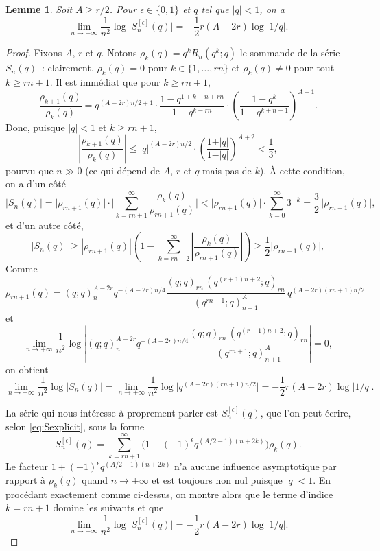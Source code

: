 \documentclass[12pt]{amsart}
\newcommand{\io}{\infty}
\newcommand{\ep}{\epsilon}
\newtheorem{lem}{Lemme}
\theoremstyle{remark}
\numberwithin{equation}{section}
\begin{document}
\begin{lem}\label{lem:asympserie}
Soit $A\ge r/2$.
Pour $\ep\in\{0,1\}$ et $q$ tel que $\vert q\vert<1$, on a
$$
\lim_{n\to +\io}\frac{1}{n^2}\log\vert S_{n}^{[\ep]}(q)\vert 
= -\frac 12 r(A-2r) \log\vert 1/q\vert .
$$
\end{lem}
\begin{proof} Fixons $A$, $r$ et $q$. 
Notons $\rho_{k}(q)=q^kR_n(q^k;q)$ le sommande de la s{\'e}rie
$S_n(q)$~: clairement, $\rho_k(q)=0$ pour 
$k\in\{1, \ldots, rn\}$ et $\rho_k(q)\ne 0$ pour 
tout $k\ge rn+1$. Il est imm{\'e}diat que pour $k\ge rn+1$, 
$$
\frac{\rho_{k+1}(q)}{\rho_{k}(q)}=
q^{(A-2r)n/2+1}\cdot 
\frac{1-q^{1+k+n+rn}}{1-q^{k-rn}}\cdot 
\left( \frac{1-q^k}{1-q^{k+n+1}}\right)^{A+1}.
$$
Donc, puisque $\vert q\vert <1$ et $k\ge rn+1$,  
$$
\left\vert\frac{\rho_{k+1}(q)}{\rho_{k}(q)}\right\vert \le \vert q\vert ^{(A-2r)n/2}\cdot 
\left(\frac{1+\vert q\vert }{1-\vert q\vert }\right)^{A+2}< \frac{1}{3},
$$
pourvu que $n\gg 0$ (ce qui d{\'e}pend de $A$, $r$ et $q$ mais pas de
$k$). {\`A} cette condition, 
on a d'un c{\^o}t{\'e} 
\begin{equation*}
\vert S_n(q)\vert = 
\vert \rho_{rn+1}(q)\vert \cdot
\bigg\vert \sum_{k=rn+1}^{\io}\frac{\rho_{k}(q)}{\rho_{rn+1}(q)}\bigg
\vert 
< \vert \rho_{rn+1}(q)\vert \cdot \sum_{k=0}^{\io} 3^{-k} = \frac 3 2 \,\vert
\rho_{rn+1}(q)\vert,
\end{equation*}
et d'un autre c{\^o}t{\'e}, 
$$
\vert S_n(q)\vert\ge  |\rho_{rn+1}(q)| \left(1-\sum_{k=rn+2}^{\io} \left\vert  
\frac {\rho_k(q)} {\rho_{rn+1}(q)} \right\vert  \right)
\ge \frac 12
\vert \rho_{rn+1}(q)\vert ,
$$
Comme 
$$
\rho_{rn+1}(q)= (q;q)_{n}^{A-2r}q^{-(A-2r)n/4}
\frac{(q;q)_{rn}\,(q^{(r+1)n+2};q)_{rn}}{(q^{rn+1};q)_{n+1}^A} \,q^{(A-2r)(rn+1)n/2}
$$
et 
$$
\lim_{n\to+\io} \frac{1}{n^2}\log\left\vert (q;q)_{n}^{A-2r}q^{-(A-2r)n/4}
\frac{(q;q)_{rn}\,(q^{(r+1)n+2};q)_{rn}}{(q^{rn+1};q)_{n+1}^A}\right\vert =0,
$$
on obtient   
\begin{equation*}
\lim_{n\to +\io}\frac{1}{n^2}\log\vert S_{n}(q)\vert 
=
 \lim_{n\to +\io}\frac{1}{n^2}
\log\vert q^{(A-2r)(rn+1)n/2}\vert= -\frac12 r(A-2r)  \log\vert 1/q\vert. 
\end{equation*}

La s{\'e}rie qui nous int{\'e}resse {\`a} proprement parler est $S^{[\ep]}_n(q)$,
que l'on peut {\'e}crire, selon \eqref{eq:Sexplicit}, sous la forme
$$
S^{[\ep]}_n(q)=
\sum_{k=rn+1}^{\io}\bigl(1+(-1)^{\ep} q^{(A/2-1)(n+2k)}\bigr)\rho_k(q).
$$
Le facteur $1+(-1)^{\ep} q^{(A/2-1)(n+2k)}$  n'a aucune influence 
asymptotique par rapport {\`a} $\rho_k(q)$ quand $n\to +\io$ et est toujours 
non nul 
puisque $\vert q\vert<1$.
En proc{\'e}dant exactement comme ci-dessus, on montre alors que
 le terme d'indice $k=rn+1$ domine les suivants et que  
$$
\lim_{n\to +\io}\frac{1}{n^2}\log\vert S_{n}^{[\ep]}(q)
\vert = -\frac12 r(A-2r) \log\vert  1/q\vert.
$$
\end{proof}
\end{document}
